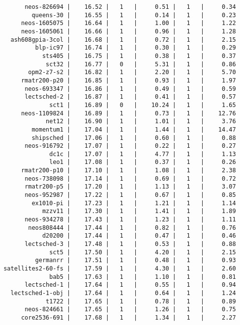 \begin{verbatim}
       neos-826694 |    16.52 |   1   |     0.51 |   1   |     0.34
         queens-30 |    16.55 |   1   |     0.14 |   1   |     0.23
      neos-1605075 |    16.64 |   1   |     1.00 |   1   |     1.22
      neos-1605061 |    16.66 |   1   |     0.96 |   1   |     1.28
   ash608gpia-3col |    16.68 |   1   |     0.72 |   1   |     2.15
          blp-ic97 |    16.74 |   1   |     0.30 |   1   |     0.29
            sts405 |    16.75 |   1   |     0.38 |   1   |     0.37
             sct32 |    16.77 |   0   |     5.31 |   1   |     0.86
        opm2-z7-s2 |    16.82 |   1   |     2.20 |   1   |     5.70
      rmatr200-p20 |    16.85 |   1   |     0.93 |   1   |     1.97
       neos-693347 |    16.86 |   1   |     0.49 |   1   |     0.59
       lectsched-2 |    16.87 |   1   |     0.41 |   1   |     0.57
              sct1 |    16.89 |   0   |    10.24 |   1   |     1.65
      neos-1109824 |    16.89 |   1   |     0.73 |   1   |    12.76
             net12 |    16.90 |   1   |     1.01 |   1   |     3.76
         momentum1 |    17.04 |   1   |     1.44 |   1   |    14.47
         shipsched |    17.06 |   1   |     0.60 |   1   |     0.88
       neos-916792 |    17.07 |   1   |     0.22 |   1   |     0.27
              dc1c |    17.07 |   1   |     4.77 |   1   |     1.13
              leo1 |    17.08 |   1   |     0.37 |   1   |     0.26
      rmatr200-p10 |    17.10 |   1   |     1.08 |   1   |     2.38
       neos-738098 |    17.14 |   1   |     0.69 |   1   |     0.72
       rmatr200-p5 |    17.20 |   1   |     1.13 |   1   |     3.07
       neos-952987 |    17.22 |   1   |     0.67 |   1   |     0.85
         ex1010-pi |    17.23 |   1   |     1.21 |   1   |     1.14
            mzzv11 |    17.30 |   1   |     1.41 |   1   |     1.89
       neos-934278 |    17.43 |   1   |     1.23 |   1   |     1.11
        neos808444 |    17.44 |   1   |     0.82 |   1   |     0.76
            d20200 |    17.44 |   1   |     0.47 |   1   |     0.46
       lectsched-3 |    17.48 |   1   |     0.53 |   1   |     0.88
              sct5 |    17.50 |   1   |     4.20 |   1   |     2.15
          germanrr |    17.51 |   1   |     0.48 |   1   |     0.93
 satellites2-60-fs |    17.59 |   1   |     4.30 |   1   |     2.60
              bab5 |    17.63 |   1   |     1.10 |   1   |     0.81
       lectsched-1 |    17.64 |   1   |     0.55 |   1   |     0.94
   lectsched-1-obj |    17.64 |   1   |     0.64 |   1   |     1.24
             t1722 |    17.65 |   1   |     0.78 |   1   |     0.89
       neos-824661 |    17.65 |   1   |     1.26 |   1   |     0.75
      core2536-691 |    17.68 |   1   |     1.34 |   1   |     2.27

\end{verbatim}
